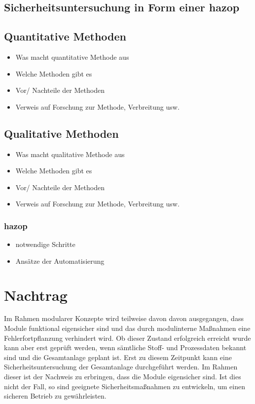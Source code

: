 \subsection{Sicherheitsuntersuchung in Form einer \ac{hazop}}
\subsection{Quantitative Methoden}
\begin{itemize}
\item Was macht quantitative Methode aus
\item Welche Methoden gibt es
\item Vor/ Nachteile der Methoden
\item Verweis auf Forschung zur Methode, Verbreitung usw.
\end{itemize}
\subsection{Qualitative Methoden}
\begin{itemize}
\item Was macht qualitative Methode aus
\item Welche Methoden gibt es
\item Vor/ Nachteile der Methoden
\item Verweis auf Forschung zur Methode, Verbreitung usw.
\end{itemize}
  \subsubsection{\ac{hazop}}
  \begin{itemize}
  \item notwendige Schritte
  \item Ans\"atze der Automatisierung
  \end{itemize}

\section{Nachtrag}
Im Rahmen modularer Konzepte wird teilweise davon davon ausgegangen, dass Module funktional eigensicher sind und das durch modulinterne Ma\ss{}nahmen eine Fehlerfortpflanzung verhindert wird. \cite[S. 4]{Urbas_2012a} Ob dieser Zustand erfolgreich erreicht wurde kann aber erst gepr\"uft werden, wenn s\"amtliche Stoff- und Prozessdaten bekannt sind und die Gesamtanlage geplant ist. Erst zu diesem Zeitpunkt kann eine Sicherheitsuntersuchung der Gesamtanlage durchgef\"uhrt werden. Im Rahmen dieser ist der Nachweis zu erbringen, dass die Module eigensicher sind. Ist dies nicht der Fall, so sind geeignete Sicherheitsma\ss{}nahmen zu entwickeln, um einen sicheren Betrieb zu gew\"ahrleisten.  